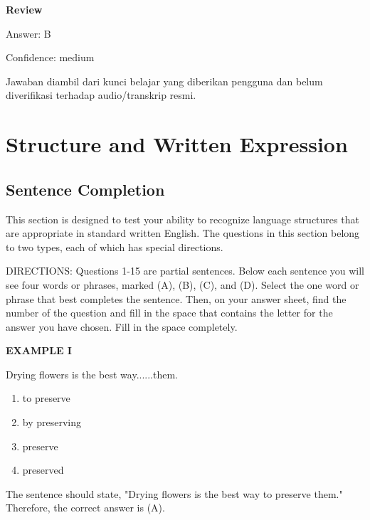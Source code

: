\documentclass[12pt]{article}
\begin{document}
\par
\begingroup
\setlength{\parskip}{0pt}
\setlength{\parindent}{0pt}
\textbf{Review}\par
Answer: B\par
Confidence: medium\par
Jawaban diambil dari kunci belajar yang diberikan pengguna dan belum diverifikasi terhadap audio/transkrip resmi.\par
\endgroup
\par
\vspace{0.25\baselineskip}
\section*{Structure and Written Expression}
\subsection*{Sentence Completion}
This section is designed to test your ability to recognize language structures that are appropriate in standard written English. The questions in this section belong to two types, each of which has special directions.\par
DIRECTIONS: Questions 1-15 are partial sentences. Below each sentence you will see four words or phrases, marked (A), (B), (C), and (D). Select the one word or phrase that best completes the sentence. Then, on your answer sheet, find the number of the question and fill in the space that contains the letter for the answer you have chosen. Fill in the space completely.\par
\begin{exampleblock}
\textbf{EXAMPLE I}\par
\noindent Drying flowers is the best way......them.
\begin{enumerate}[label=(\Alph*),leftmargin=*,itemsep=0.2em]
\item to preserve
\item by preserving
\item preserve
\item preserved
\end{enumerate}
\vspace{0.25\baselineskip}
The sentence should state, "Drying flowers is the best way to preserve them." Therefore, the correct answer is (A).\par
\end{exampleblock}
\end{document}
